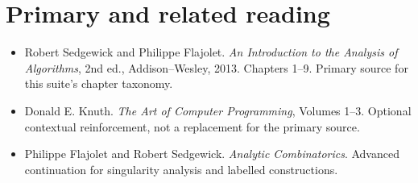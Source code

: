 \documentclass[11pt]{article}
\begin{document}
\section{Primary and related reading}
\begin{itemize}
\item Robert Sedgewick and Philippe Flajolet. \emph{An Introduction to the Analysis of Algorithms}, 2nd ed., Addison--Wesley, 2013. Chapters 1--9. Primary source for this suite's chapter taxonomy.
\item Donald E. Knuth. \emph{The Art of Computer Programming}, Volumes 1--3. Optional contextual reinforcement, not a replacement for the primary source.
\item Philippe Flajolet and Robert Sedgewick. \emph{Analytic Combinatorics}. Advanced continuation for singularity analysis and labelled constructions.
\end{itemize}
\end{document}
